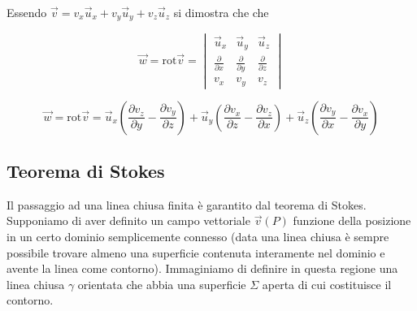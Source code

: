 Essendo $ \vec{v} = v_x\vec{u}_x +v_y\vec{u}_y + v_z\vec{u}_z    $ si dimostra che che

\[
	\vec{w} = \text{rot}\vec{v} = \begin{vmatrix}
		\vec{u}_x & \vec{u}_y & \vec{u}_z \\
		\frac{\partial}{\partial x} & \frac{\partial}{\partial y} & \frac{\partial}{\partial z}  \\
		v_x & v_y & v_z
	\end{vmatrix}
\]

\[
	\vec{w} = \text{rot}\vec{v} = \vec{u}_x\left( \frac{\partial v_z}{\partial y} -\frac{\partial v_y}{\partial z}  \right)  +
	\vec{u}_y\left( \frac{\partial v_x}{\partial z} -\frac{\partial v_z}{\partial x}  \right)  +
	\vec{u}_z\left( \frac{\partial v_y}{\partial x} -\frac{\partial v_x}{\partial y}  \right)
\]

\subsection{Teorema di Stokes}

Il passaggio ad una linea chiusa finita è garantito dal teorema di Stokes. Supponiamo di aver definito un campo vettoriale $\vec{v}(P)$ funzione della posizione in un certo dominio semplicemente connesso (data una linea chiusa è sempre possibile trovare almeno una superficie contenuta interamente nel dominio e avente la linea come contorno). Immaginiamo di definire in questa regione una linea chiusa $\gamma$ orientata che abbia una superficie $\Sigma$ aperta di cui costituisce il contorno.

